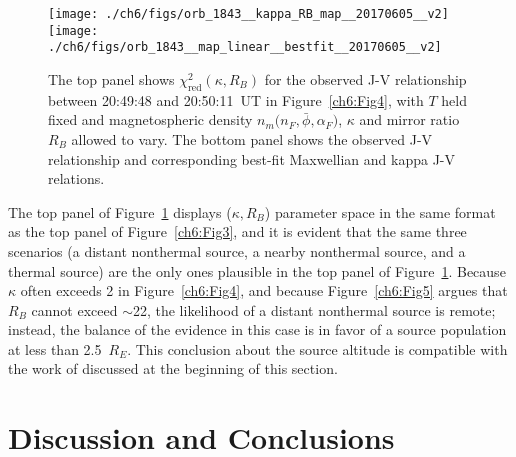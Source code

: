   \begin{figure}
    \centering
    \noindent\texttt{[image: ./ch6/figs/orb\_1843\_\_kappa\_RB\_map\_\_20170605\_\_v2]}
    \noindent\texttt{[image: ./ch6/figs/orb\_1843\_\_map\_linear\_\_bestfit\_\_20170605\_\_v2]}
    \caption[Orbit 1843: Reduced chi-squared values for observed J-V curves and
    corresponding best-fit J-V curves.]{The top panel shows
      $\chi^2_{\mathrm{red}} ( \kappa, R_B)$ for the observed J-V relationship
      between 20:49:48 and 20:50:11~UT in Figure~\ref{ch6:Fig4}, with $T$ held
      fixed and magnetospheric density $n_m \big ( n_F, \bar{\phi}, \alpha_F
      \big )$, $\kappa$ and mirror ratio $R_B$ allowed to vary. The bottom panel
      shows the observed J-V relationship and corresponding best-fit Maxwellian
      and kappa J-V relations.}
    \label{ch6:Fig6}
  \end{figure}

  The top panel of Figure~\ref{ch6:Fig6} displays ($\kappa, R_B$) parameter
  space in the same format as the top panel of Figure~\ref{ch6:Fig3}, and it is
  evident that the same three scenarios (a distant nonthermal source, a nearby
  nonthermal source, and a thermal source) are the only ones plausible in the
  top panel of Figure~\ref{ch6:Fig6}. Because $\kappa$ often exceeds 2 in
  Figure~\ref{ch6:Fig4}, and because Figure~\ref{ch6:Fig5} argues that $R_B$
  cannot exceed $\sim$22, the likelihood of a distant nonthermal source is
  remote; instead, the balance of the evidence in this case is in favor of a
  source population at less than 2.5~$R_E$. This conclusion about the source
  altitude is compatible with the work of \citet{Ergun1998} discussed at the
  beginning of this section.
  
  \section{Discussion and Conclusions}

